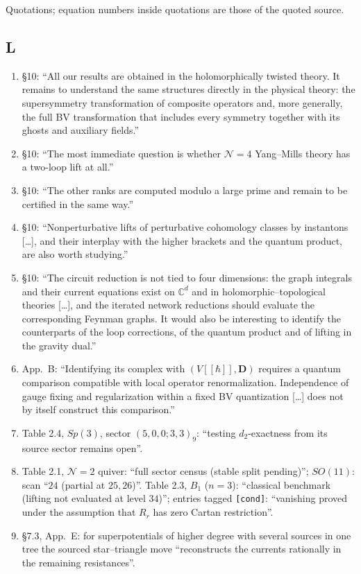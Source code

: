 \documentclass[10pt,a4paper]{article}
\numberwithin{equation}{section}
\begin{document}
Quotations; equation numbers inside quotations are those of the quoted source.

\subsection{\textsf{L}}
\begin{enumerate}\itemsep1pt
\item \S10: ``All our results are obtained in the holomorphically twisted theory. It remains to understand the same structures directly in the physical theory: the supersymmetry transformation of composite operators and, more generally, the full BV transformation that includes every symmetry together with its ghosts and auxiliary fields.''
\item \S10: ``The most immediate question is whether $\mathcal N=4$ Yang--Mills theory has a two-loop lift at all.''
\item \S10: ``The other ranks are computed modulo a large prime and remain to be certified in the same way.''
\item \S10: ``Nonperturbative lifts of perturbative cohomology classes by instantons [\dots], and their interplay with the higher brackets and the quantum product, are also worth studying.''
\item \S10: ``The circuit reduction is not tied to four dimensions: the graph integrals and their current equations exist on $\mathbb C^d$ and in holomorphic--topological theories [\dots], and the iterated network reductions should evaluate the corresponding Feynman graphs. It would also be interesting to identify the counterparts of the loop corrections, of the quantum product and of lifting in the gravity dual.''
\item App.~B: ``Identifying its complex with $(V[[\hbar]],\mathbf D)$ requires a quantum comparison compatible with local operator renormalization. Independence of gauge fixing and regularization within a fixed BV quantization [\dots] does not by itself construct this comparison.''
\item Table 2.4, $Sp(3)$, sector $(5,0,0;3,3)_9$: ``testing $d_2$-exactness from its source sector remains open''.
\item Table 2.1, $\mathcal N=2$ quiver: ``full sector census (stable split pending)''; $SO(11)$: scan ``$24$ (partial at $25,26$)''. Table 2.3, $B_1$ ($n=3$): ``classical benchmark (lifting not evaluated at level $34$)''; entries tagged \texttt{[cond]}: ``vanishing proved under the assumption that $R_r$ has zero Cartan restriction''.
\item \S7.3, App.~E: for superpotentials of higher degree with several sources in one tree the sourced star--triangle move ``reconstructs the currents rationally in the remaining resistances''.
\end{enumerate}
\end{document}
